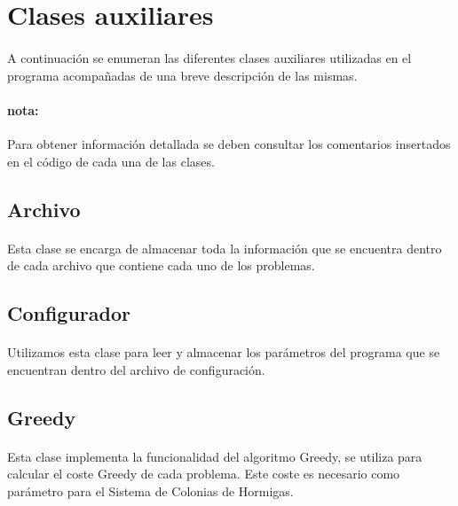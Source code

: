 	\section{Clases auxiliares}
	
	\paragraph{} A continuación se enumeran las diferentes clases auxiliares utilizadas en el programa acompañadas de una breve descripción de las mismas.
	
	\paragraph{nota:}Para obtener información detallada se deben consultar los comentarios insertados en el código de cada una de las clases.
	
	\subsection{Archivo}
	
	\paragraph{}Esta clase se encarga de almacenar toda la información que se encuentra dentro de cada archivo que contiene cada uno de los problemas.
	
	
	\subsection{Configurador}
	
	\paragraph{}Utilizamos esta clase para leer y almacenar los parámetros del programa que se encuentran dentro del archivo de configuración.
	
	\subsection{Greedy}
	
	\paragraph{}Esta clase implementa la funcionalidad del algoritmo Greedy, se utiliza para calcular el coste Greedy de cada problema. Este coste es necesario como parámetro para el Sistema de Colonias de Hormigas.
	
